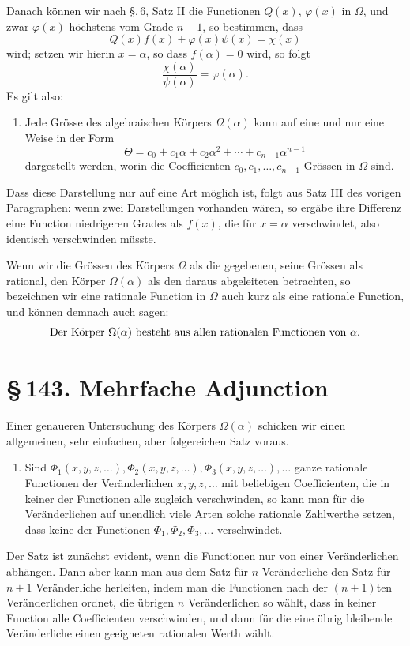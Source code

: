\documentclass[11pt]{article}
\providecommand{\sect}[2]{\section*{\S\,#1. #2}}
\begin{document}
Danach können wir nach §.\,6, Satz II die Functionen $Q(x)$, $\varphi(x)$ in $\Omega$, und zwar $\varphi(x)$ höchstens vom Grade $n-1$, so bestimmen, dass
\[
\tag{4}
        Q(x)f(x)+\varphi(x)\psi(x)=\chi(x)
\]
wird; setzen wir hierin $x=\alpha$, so dass $f(\alpha)=0$ wird, so folgt
\[
\tag{5}
        \frac{\chi(\alpha)}{\psi(\alpha)}=\varphi(\alpha).
\]
Es gilt also:

\begin{enumerate}[label=\arabic*.,leftmargin=2em]
\item Jede Grösse des algebraischen Körpers $\Omega(\alpha)$ kann auf eine und nur eine Weise in der Form
\[
        \Theta=c_0+c_1\alpha+c_2\alpha^2+\cdots+c_{n-1}\alpha^{n-1}
\]
dargestellt werden, worin die Coefficienten $c_0,c_1,\ldots,c_{n-1}$ Grössen in $\Omega$ sind.
\end{enumerate}

Dass diese Darstellung nur auf eine Art möglich ist, folgt aus Satz III des vorigen Paragraphen: wenn zwei Darstellungen vorhanden wären, so ergäbe ihre Differenz eine Function niedrigeren Grades als $f(x)$, die für $x=\alpha$ verschwindet, also identisch verschwinden müsste.

Wenn wir die Grössen des Körpers $\Omega$ als die gegebenen, seine Grössen als rational, den Körper $\Omega(\alpha)$ als den daraus abgeleiteten betrachten, so bezeichnen wir eine rationale Function in $\Omega$ auch kurz als eine rationale Function, und können demnach auch sagen:
\[
        \hbox{Der Körper }\Omega(\alpha)\hbox{ besteht aus allen rationalen Functionen von }\alpha.
\]

\sect{143}{Mehrfache Adjunction}

Einer genaueren Untersuchung des Körpers $\Omega(\alpha)$ schicken wir einen allgemeinen, sehr einfachen, aber folgereichen Satz voraus.

\begin{enumerate}[label=\arabic*.,leftmargin=2em]
\item Sind $\Phi_1(x,y,z,\ldots),\Phi_2(x,y,z,\ldots),\Phi_3(x,y,z,\ldots),\ldots$ ganze rationale Functionen der Veränderlichen $x,y,z,\ldots$ mit beliebigen Coefficienten, die in keiner der Functionen alle zugleich verschwinden, so kann man für die Veränderlichen auf unendlich viele Arten solche rationale Zahlwerthe setzen, dass keine der Functionen $\Phi_1,\Phi_2,\Phi_3,\ldots$ verschwindet.
\end{enumerate}

Der Satz ist zunächst evident, wenn die Functionen nur von einer Veränderlichen abhängen. Dann aber kann man aus dem Satz für $n$ Veränderliche den Satz für $n+1$ Veränderliche herleiten, indem man die Functionen nach der $(n+1)$ten Veränderlichen ordnet, die übrigen $n$ Veränderlichen so wählt, dass in keiner Function alle Coefficienten verschwinden, und dann für die eine übrig bleibende Veränderliche einen geeigneten rationalen Werth wählt.
\end{document}
